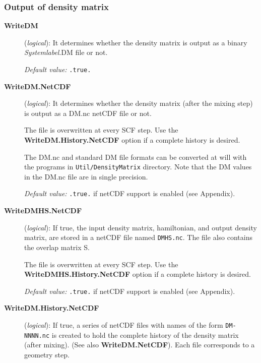 \documentclass[11pt]{article}
\begin{document}
\begin{description}
\begin{description}
\end{description}



\subsubsection{Output of density matrix}

\begin{description}
\item[{\bf WriteDM}] ({\it logical}): 
 It determines whether the density matrix
is output as a binary {\it Systemlabel}.DM file or not.

{\it Default value:} {\tt .true.}

\item[{\bf WriteDM.NetCDF}] ({\it logical}): 
 It determines whether the density matrix
(after the mixing step) is output as a DM.nc netCDF file or not.

The file is overwritten at every SCF step. Use the {\bf
WriteDM.History.NetCDF} option if a complete history is desired.

The DM.nc and standard DM file formats can be converted at will with
the programs in {\tt Util/DensityMatrix} directory. Note that the
DM values in the DM.nc file are in single precision.

{\it Default value:} {\tt .true.} if netCDF support is enabled (see Appendix).

\item[{\bf WriteDMHS.NetCDF}] ({\it logical}): 
If true, the input density matrix, hamiltonian, and output density matrix, are stored in a netCDF file
named {\tt DMHS.nc}. The file also contains the overlap matrix S. 

The file is overwritten at every SCF step. Use the {\bf
  WriteDMHS.History.NetCDF} option if a complete history is desired.

{\it Default value:} {\tt .true.} if netCDF support is enabled (see Appendix).

\item[{\bf WriteDM.History.NetCDF}] ({\it logical}):
 If
true, a series of netCDF files with names of the form {\tt DM-NNNN.nc}
is created to hold the complete history of the density matrix (after
mixing).  (See also {\bf WriteDM.NetCDF}). Each file corresponds to a
geometry step.


\end{description}
\end{description}
\end{document}
